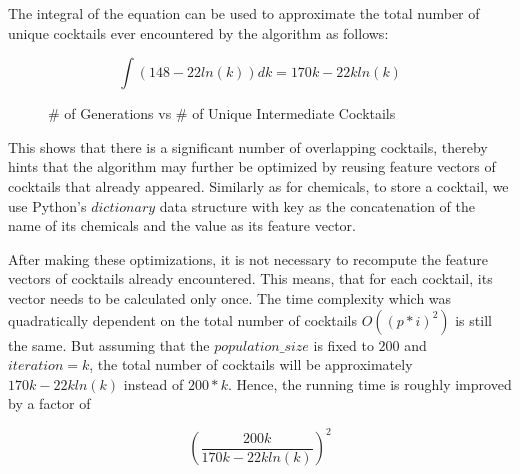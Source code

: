 The integral of the equation can be used to approximate  the total number of unique cocktails ever encountered by the algorithm as follows:

\begin{equation}
\int (148 - 22 ln(k))dk = 170 k - 22 kln(k)  \label{eq}
\end{equation}

\begin{figure}[H]
	\caption{\# of Generations vs \# of Unique Intermediate Cocktails}
	\label{fig:unique-intermediates}
\end{figure}

This shows that there is a significant number of overlapping cocktails, thereby hints that the algorithm may further be optimized by reusing feature vectors of cocktails that already appeared. Similarly as for chemicals, to store a cocktail, we use Python's $dictionary$ data structure with key as the concatenation of the name of its chemicals and the value as its feature vector.





After making these optimizations, it is not necessary to recompute the feature vectors of cocktails already encountered. 
This means, that for each cocktail, its vector needs to be calculated only once.
The time complexity which was quadratically dependent on the total number of cocktails $O ( (p * i)^2 )$  is still the same. But assuming that the $population\_size$ is fixed to $200$ and $iteration=k$, the total number of cocktails will be approximately $170k - 22kln(k)$ instead of $200*k$. Hence, the running time is roughly improved by a factor of 

\begin{equation}
\left(\frac{200k}{170k - 22kln(k)}\right)^2  \label{eq}
\end{equation}

